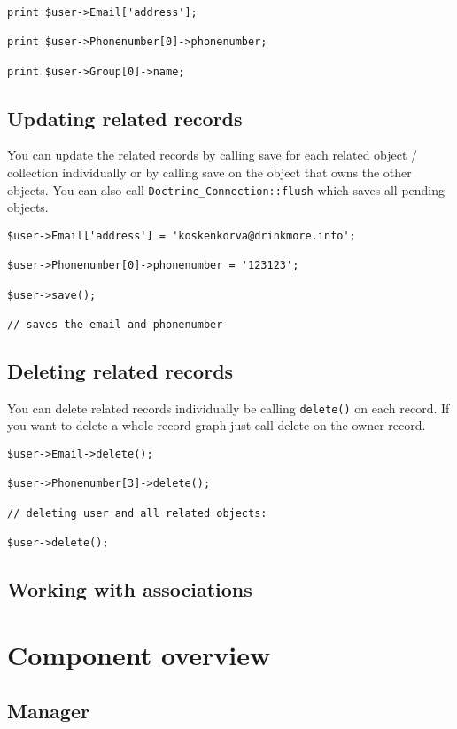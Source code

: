\documentclass[11pt,a4paper]{report}
\begin{document}
\begin{verbatim}
print $user->Email['address'];

print $user->Phonenumber[0]->phonenumber;

print $user->Group[0]->name;
\end{verbatim}

\subsection{Updating related records}
You can update the related records by calling save for each related object / collection individually or by calling save on the object that owns the other objects. You can also call \texttt{Doctrine\_Connection::flush} which saves all pending objects.

\begin{verbatim}
$user->Email['address'] = 'koskenkorva@drinkmore.info';

$user->Phonenumber[0]->phonenumber = '123123';

$user->save();

// saves the email and phonenumber
\end{verbatim}

\subsection{Deleting related records}
You can delete related records individually be calling \texttt{delete()} on each record. If you want to delete a whole record graph just call delete on the owner record.

\begin{verbatim}
$user->Email->delete();

$user->Phonenumber[3]->delete();

// deleting user and all related objects:

$user->delete();
\end{verbatim}

\subsection{Working with associations}
\section{Component overview}
\subsection{Manager}
\end{document}
